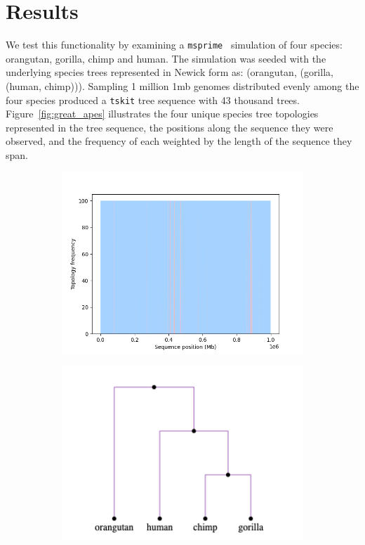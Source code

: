 \documentclass{article}
\newcommand{\tskit}{{\texttt{tskit}}}
\newcommand{\msprime}{{\texttt{msprime}}}
\begin{document}
\section{Results}
We test this functionality by examining a \msprime{}~\citep{msprime} simulation of four species:
orangutan, gorilla, chimp and human. The simulation was seeded with the underlying
species trees represented in Newick form as: (orangutan, (gorilla, (human, chimp))).
Sampling 1 million 1mb genomes distributed evenly among the four species
produced a \tskit{} tree sequence with 43 thousand trees.
Figure~\ref{fig:great_apes} illustrates the four unique
species tree topologies represented in the tree sequence, the positions
along the sequence they were observed, and the frequency of each weighted by
the length of the sequence they span.

\begin{figure}[H]
    \begin{minipage}{.48\textwidth}
        \begin{subfigure}{\linewidth}
            \includegraphics[scale=0.48]{great_apes_area_plot.png}
        \end{subfigure}
    \end{minipage}
    \begin{minipage}{.48\textwidth}
        \begin{minipage}{.4\textwidth}
            \begin{subfigure}[b]{\linewidth}
                \includegraphics[scale=0.3]{tree_0.png}

\end{subfigure}
\end{minipage}
\end{minipage}
\end{figure}
\end{document}
